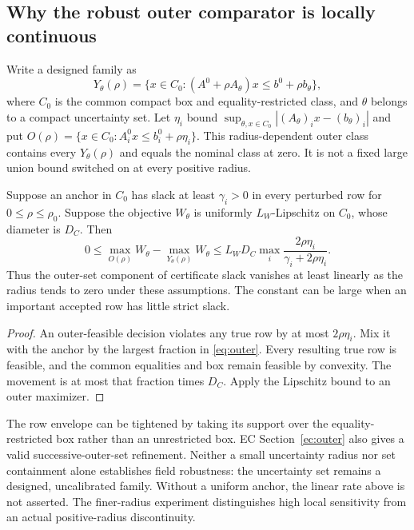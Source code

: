 \subsection{Why the robust outer comparator is locally continuous}
Write a designed family as
\[
 Y_\theta(\rho)=\{x\in C_0:(A^0+\rho A_\theta)x\leq b^0+\rho b_\theta\},
\]
where $C_0$ is the common compact box and equality-restricted class, and $\theta$ belongs to a compact uncertainty set. Let $\eta_i$ bound
$\sup_{\theta,x\in C_0}|(A_\theta)_i x-(b_\theta)_i|$ and put
$O(\rho)=\{x\in C_0:A_i^0x\leq b_i^0+\rho\eta_i\}$.
This radius-dependent outer class contains every $Y_\theta(\rho)$ and equals the nominal class at zero. It is not a fixed large union bound switched on at every positive radius.
\begin{proposition}\label{prop:outer}
Suppose an anchor in $C_0$ has slack at least $\gamma_i>0$ in every perturbed row for $0\leq\rho\leq\rho_0$. Suppose the objective $W_\theta$ is uniformly $L_W$-Lipschitz on $C_0$, whose diameter is $D_C$. Then
\begin{equation}\label{eq:outer}
 0\leq\max_{O(\rho)}W_\theta-\max_{Y_\theta(\rho)}W_\theta
 \leq L_WD_C\max_i\frac{2\rho\eta_i}{\gamma_i+2\rho\eta_i}.
\end{equation}
Thus the outer-set component of certificate slack vanishes at least linearly as the radius tends to zero under these assumptions. The constant can be large when an important accepted row has little strict slack.
\end{proposition}
\begin{proof}
An outer-feasible decision violates any true row by at most $2\rho\eta_i$. Mix it with the anchor by the largest fraction in \eqref{eq:outer}. Every resulting true row is feasible, and the common equalities and box remain feasible by convexity. The movement is at most that fraction times $D_C$. Apply the Lipschitz bound to an outer maximizer.\end{proof}

The row envelope can be tightened by taking its support over the equality-restricted box rather than an unrestricted box. EC Section~\ref{ec:outer} also gives a valid successive-outer-set refinement. Neither a small uncertainty radius nor set containment alone establishes field robustness: the uncertainty set remains a designed, uncalibrated family. Without a uniform anchor, the linear rate above is not asserted. The finer-radius experiment distinguishes high local sensitivity from an actual positive-radius discontinuity.




